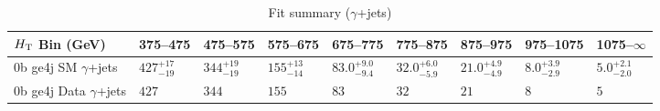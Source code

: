 \documentclass[8pt]{article}
\def\scalht{\mbox{$H_{\rm{T}}$}\xspace}
\newcommand\T{\rule{0pt}{2.6ex}}
\begin{document}
\begin{table}[ht!]
\caption{Fit summary ($\gamma$+jets)}
\label{tab:ensemble-summary}
\centering
\begin{tabular}{ lllllllll }

\hline
\scalht Bin (GeV)       & 375--475                       & 475--575                       & 575--675                       & 675--775                       & 775--875                       & 875--975                       & 975--1075                      & 1075--$\infty$                 \\ [1.000000ex]
\hline
0b ge4j SM $\gamma$+jets\T & $427^{+17}_{-19}$              & $344^{+19}_{-19}$              & $155^{+13}_{-14}$              & $83.0^{+9.0}_{-9.4}$           & $32.0^{+6.0}_{-5.9}$           & $21.0^{+4.9}_{-4.9}$           & $8.0^{+3.9}_{-2.9}$            & $5.0^{+2.1}_{-2.0}$            \\ 
0b ge4j Data $\gamma$+jets\T & $427$                          & $344$                          & $155$                          & $83$                           & $32$                           & $21$                           & $8$                            & $5$                            \\ 
\hline

\end{tabular}
\end{table}
\end{document}

